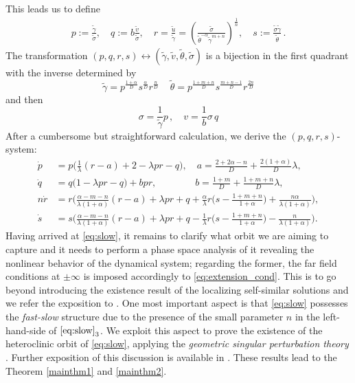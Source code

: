 \documentclass[a4paper,11pt]{article}
\def\tg{{\tilde{\gamma}}}
\def\tv{{\tilde{v}}}
\def\tth{{\tilde{\theta}}}
\def\ts{{\tilde{\sigma}}}
\def\tu{{\tilde{u}}}
\theoremstyle{remark}
\begin{document}
This leads us to define
\begin{equation}\label{eq:pqrdef}
 \begin{aligned}
  p :=\frac{\tg}{\ts}, \quad q :=b \frac{\tv}{\ts},  \quad r = \frac{\tu}{\tg} = \left ( \frac{\ts}{ \tth^{-\alpha} \tg^{m+n}} \right )^\frac{1}{n}  , \quad s := \frac{\ts\tg}{\tth} \, .
 \end{aligned}
\end{equation}
The transformation $(p,q,r,s) \leftrightarrow (\tg,\tv, \tth,\ts)$ is a bijection in the first quadrant with the inverse determined by
$$
\tg = p^\frac{1+\alpha}{D} s^\frac{\alpha}{D} r^\frac{n}{D} \, \quad \tth = p^\frac{1+m+n}{D} s^\frac{m+n-1}{D} r^\frac{2n}{D}
$$
and then
$$
\sigma = \frac{1}{\tg} p \, , \quad v = \frac{1}{b} \sigma \, q
$$
After a cumbersome but straightforward calculation, we derive the $(p,q,r,s)$-system:
\begin{equation}\label{eq:slow} \tag{S}
 \begin{aligned}
 \dot{p} &=p\Big(\frac{1}{\lambda}(r-a) + 2- \lambda p r -q\Big), \quad a=\frac{2+2\alpha-n}{D} + \frac{2(1 + \alpha)}{D}\lambda,\\
 \dot{q} &=q\Big(1 -\lambda p r -q\Big) + b p r, \quad \quad \quad \quad b=\frac{1+m}{D} + \frac{1+m+n}{D}\lambda,\\
 n\dot{r} &=r\Big(\frac{\alpha-m-n}{\lambda(1+\alpha)}(r-a) + \lambda pr + q +\frac{\alpha}{\lambda}r\big(s- \frac{1+m+n}{1+\alpha}\big) + \frac{n\alpha}{\lambda(1+\alpha)}\Big),\\
 \dot{s} &=s\Big(\frac{\alpha-m-n}{\lambda(1+\alpha)}(r-a) + \lambda pr + q - \frac{1}{\lambda}r\big(s- \frac{1+m+n}{1+\alpha}\big) - \frac{n}{\lambda(1+\alpha)}\Big).
 \end{aligned}
\end{equation}
Having arrived at \eqref{eq:slow}, it remains to clarify what orbit we are aiming to capture and it needs to perform a phase space analysis of it revealing the nonlinear behavior of the dynamical system; regarding the former, the far field conditions at $\pm\infty$ is imposed accordingly to \eqref{eq:extension_cond}. This is to go beyond introducing the existence result of the localizing self-similar solutions and we refer the exposition to \cite{KLT17}. One most important aspect is that \eqref{eq:slow} possesses the {\it fast-slow} structure due to the presence of the small parameter $n$ in the left-hand-side of $\eqref{eq:slow}_3$. We exploit this aspect to prove the existence of the heteroclinic orbit of \eqref{eq:slow},  applying the {\it geometric singular perturbation theory} \cite{fenichel_geometric_1979}. Further exposition of this discussion is available in \cite{KLT17}. These results lead to the Theorem \ref{mainthm1} and \ref{mainthm2}.
\end{document}
